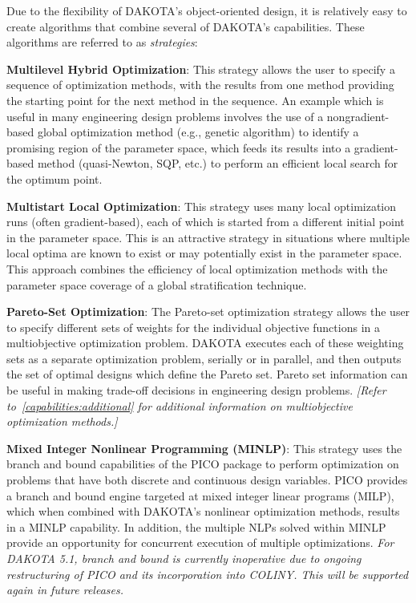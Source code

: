 Due to the flexibility of DAKOTA's object-oriented design, it is
relatively easy to create algorithms that combine several of DAKOTA's
capabilities. These algorithms are referred to as \emph{strategies}:

\textbf{Multilevel Hybrid Optimization}: This strategy allows the user to
specify a sequence of optimization methods, with the results from one
method providing the starting point for the next method in the
sequence. An example which is useful in many engineering design
problems involves the use of a nongradient-based global optimization
method (e.g., genetic algorithm) to identify a promising region of the
parameter space, which feeds its results into a gradient-based method
(quasi-Newton, SQP, etc.) to perform an efficient local search for the
optimum point.

\textbf{Multistart Local Optimization}: This strategy uses many local
optimization runs (often gradient-based), each of which is started
from a different initial point in the parameter space. This is an
attractive strategy in situations where multiple local optima are
known to exist or may potentially exist in the parameter space. This
approach combines the efficiency of local optimization methods with
the parameter space coverage of a global stratification technique.

\textbf{Pareto-Set Optimization}: The Pareto-set optimization strategy
allows the user to specify different sets of weights for the
individual objective functions in a multiobjective optimization
problem. DAKOTA executes each of these weighting sets as a separate
optimization problem, serially or in parallel, and then outputs the
set of optimal designs which define the Pareto set. Pareto set
information can be useful in making trade-off decisions in engineering
design problems.  \emph{[Refer to~\ref{capabilities:additional} for
additional information on multiobjective optimization methods.]}

\textbf{Mixed Integer Nonlinear Programming (MINLP)}: This strategy uses
the branch and bound capabilities of the PICO package to perform
optimization on problems that have both discrete and continuous design
variables. PICO provides a branch and bound engine targeted at mixed
integer linear programs (MILP), which when combined with DAKOTA's
nonlinear optimization methods, results in a MINLP capability. In
addition, the multiple NLPs solved within MINLP provide an opportunity
for concurrent execution of multiple optimizations.
\emph{For DAKOTA 5.1, branch and bound is currently inoperative due to 
ongoing restructuring of PICO and its incorporation into COLINY.
This will be supported again in future releases.}

